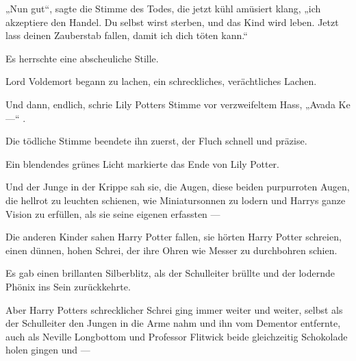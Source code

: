 \begin{em}
„Nun gut“, sagte die Stimme des Todes, die jetzt kühl amüsiert klang, „ich akzeptiere den Handel. Du selbst wirst sterben, und das Kind wird leben. Jetzt lass deinen Zauberstab fallen, damit ich dich töten kann.“

Es herrschte eine abscheuliche Stille.

Lord Voldemort begann zu lachen, ein schreckliches, verächtliches Lachen.

Und dann, endlich, schrie Lily Potters Stimme vor verzweifeltem Hass,
„Avada Ke —“ .

Die tödliche Stimme beendete ihn zuerst, der Fluch schnell und präzise.


Ein blendendes grünes Licht markierte das Ende von Lily Potter.

Und der Junge in der Krippe sah sie, die Augen, diese beiden purpurroten Augen, die hellrot zu leuchten schienen, wie Miniatursonnen zu lodern und Harrys ganze Vision zu erfüllen, als sie seine eigenen erfassten —
\end{em}

\later

Die anderen Kinder sahen Harry Potter fallen, sie hörten Harry Potter schreien, einen dünnen, hohen Schrei, der ihre Ohren wie Messer zu durchbohren schien.

Es gab einen brillanten Silberblitz, als der Schulleiter  brüllte und der lodernde Phönix ins Sein zurückkehrte.

Aber Harry Potters schrecklicher Schrei ging immer weiter und weiter, selbst als der Schulleiter den Jungen in die Arme nahm und ihn vom Dementor entfernte, auch als Neville Longbottom und Professor Flitwick beide gleichzeitig Schokolade holen gingen und —

